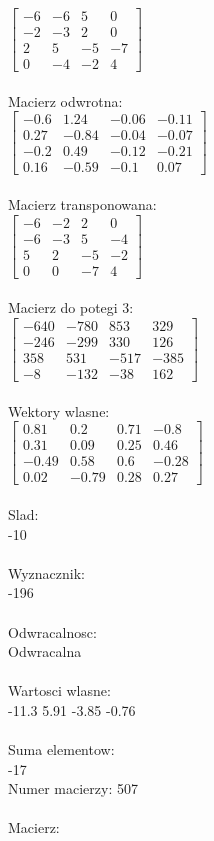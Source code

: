 \documentclass[a4paper,12pt]{article}
\begin{document}
$\begin{bmatrix} -6&-6&5&0\\-2&-3&2&0\\2&5&-5&-7\\0&-4&-2&4 \end{bmatrix}$
\\
\\
Macierz odwrotna:\\

$\begin{bmatrix} -0.6&1.24&-0.06&-0.11\\0.27&-0.84&-0.04&-0.07\\-0.2&0.49&-0.12&-0.21\\0.16&-0.59&-0.1&0.07 \end{bmatrix}$
\\
\\
Macierz transponowana:\\

$\begin{bmatrix} -6&-2&2&0\\-6&-3&5&-4\\5&2&-5&-2\\0&0&-7&4 \end{bmatrix}$
\\
\\
Macierz do potegi 3:\\

$\begin{bmatrix} -640&-780&853&329\\-246&-299&330&126\\358&531&-517&-385\\-8&-132&-38&162 \end{bmatrix}$
\\
\\
Wektory wlasne:\\

$\begin{bmatrix} 0.81&0.2&0.71&-0.8\\0.31&0.09&0.25&0.46\\-0.49&0.58&0.6&-0.28\\0.02&-0.79&0.28&0.27 \end{bmatrix}$
\\
\\
Slad:\\
-10
\\
\\
Wyznacznik:\\
-196
\\
\\
Odwracalnosc:\\
Odwracalna
\\
\\
Wartosci wlasne:\\
-11.3 5.91 -3.85 -0.76
\\
\\
Suma elementow:\\
-17
\\
\newpage
Numer macierzy:
507
\\
\\
Macierz:\\
\end{document}
